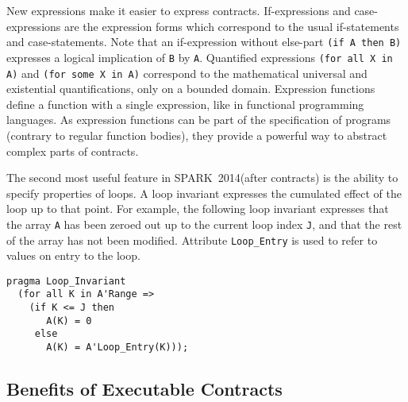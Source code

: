\documentclass[10pt,a4paper,twocolumn]{article}
\newcommand{\newspark}{SPARK~2014\xspace}
\begin{document}

New expressions make it easier to express contracts. If-expressions
and case-expressions are the expression forms which correspond to the
usual if-statements and case-statements. Note that an if-expression
without else-part \verb|(if A then B)| expresses a logical implication
of \verb|B| by \verb|A|. Quantified expressions
\verb|(for all X in A)| and \verb|(for some X in A)| correspond to the
mathematical universal and existential quantifications, only on a
bounded domain. Expression functions define a function with a single
expression, like in functional programming languages. As expression
functions can be part of the specification of programs (contrary to
regular function bodies), they provide a powerful way to abstract
complex parts of contracts.

The second most useful feature in \newspark (after contracts) is the
ability to specify properties of loops. A loop invariant expresses the
cumulated effect of the loop up to that point. For example, the
following loop invariant expresses that the array \verb|A| has been
zeroed out up to the current loop index \verb|J|, and that the rest of
the array has not been modified.  Attribute \verb|Loop_Entry| is used
to refer to values on entry to the loop.

\begin{lstlisting}
pragma Loop_Invariant
  (for all K in A'Range =>
    (if K <= J then
       A(K) = 0
     else
       A(K) = A'Loop_Entry(K)));
\end{lstlisting}



\subsection{Benefits of Executable Contracts}
\label{subsec:ExecutableContracts}
\end{document}
